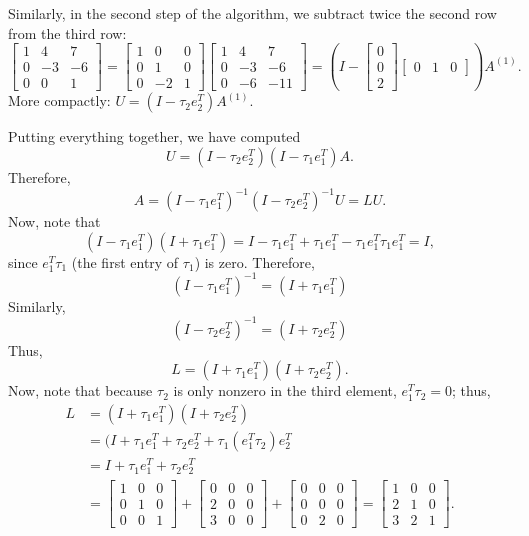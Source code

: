 Similarly, in the second step of the algorithm, we subtract twice the second
row from the third row:
\[
  \begin{bmatrix}
    1 &  4 &  7 \\
    0 & -3 & -6 \\
    0 &  0 &  1
  \end{bmatrix} =
  \begin{bmatrix}
    1 & 0 & 0 \\
    0 & 1 & 0 \\
    0 & -2 & 1
  \end{bmatrix}
  \begin{bmatrix}
    1 &  4 &  7 \\
    0 & -3 & -6 \\
    0 & -6 & -11
  \end{bmatrix} =
  \left( I - \begin{bmatrix} 0 \\ 0 \\ 2 \end{bmatrix}
             \begin{bmatrix} 0 & 1 & 0 \end{bmatrix} \right) A^{(1)}.
\]
More compactly: $U = (I-\tau_2 e_2^T) A^{(1)}$.

Putting everything together, we have computed
\[
  U = (I-\tau_2 e_2^T) (I-\tau_1 e_1^T) A.
\]
Therefore,
\[
  A = (I-\tau_1 e_1^T)^{-1} (I-\tau_2 e_2^T)^{-1} U = LU.
\]
Now, note that
\[
  (I-\tau_1 e_1^T) (I + \tau_1 e_1^T) =
  I - \tau_1 e_1^T + \tau_1 e_1^T - \tau_1 e_1^T \tau_1 e_1^T = I,
\]
since $e_1^T \tau_1$ (the first entry of $\tau_1$) is zero.  Therefore,
\[
  (I-\tau_1 e_1^T)^{-1} = (I+\tau_1 e_1^T)
\]
Similarly,
\[
  (I-\tau_2 e_2^T)^{-1} = (I+\tau_2 e_2^T)
\]
Thus,
\[
  L = (I+\tau_1 e_1^T)(I + \tau_2 e_2^T).
\]
Now, note that because $\tau_2$ is only nonzero in the third element,
$e_1^T \tau_2 = 0$; thus,
\begin{align*}
  L &= (I+\tau_1 e_1^T)(I + \tau_2 e_2^T) \\
    &= (I + \tau_1 e_1^T + \tau_2 e_2^T + \tau_1 (e_1^T \tau_2) e_2^T \\
    &= I + \tau_1 e_1^T + \tau_2 e_2^T \\
    &= \begin{bmatrix} 1 & 0 & 0 \\ 0 & 1 & 0 \\ 0 & 0 & 1 \end{bmatrix} +
       \begin{bmatrix} 0 & 0 & 0 \\ 2 & 0 & 0 \\ 3 & 0 & 0 \end{bmatrix} +
       \begin{bmatrix} 0 & 0 & 0 \\ 0 & 0 & 0 \\ 0 & 2 & 0 \end{bmatrix}
     = \begin{bmatrix} 1 & 0 & 0 \\ 2 & 1 & 0 \\ 3 & 2 & 1 \end{bmatrix}.
\end{align*}

